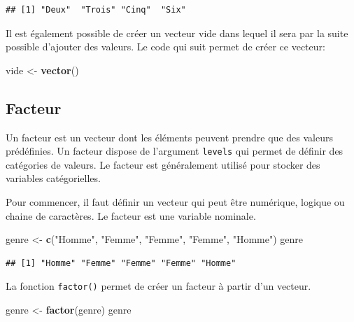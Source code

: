 \documentclass[
]{book}
\newenvironment{Shaded}{\begin{snugshade}}{\end{snugshade}}
\newcommand{\FunctionTok}[1]{\textcolor[rgb]{0.13,0.29,0.53}{\textbf{#1}}}
\newcommand{\NormalTok}[1]{#1}
\newcommand{\OtherTok}[1]{\textcolor[rgb]{0.56,0.35,0.01}{#1}}
\newcommand{\StringTok}[1]{\textcolor[rgb]{0.31,0.60,0.02}{#1}}
\begin{document}
\begin{verbatim}
## [1] "Deux"  "Trois" "Cinq"  "Six"
\end{verbatim}

Il est également possible de créer un vecteur vide dans lequel il sera par la suite possible d'ajouter des valeurs. Le code qui suit permet de créer ce vecteur:

\begin{Shaded}
\begin{Highlighting}[]
\NormalTok{vide }\OtherTok{\textless{}{-}} \FunctionTok{vector}\NormalTok{()}
\end{Highlighting}
\end{Shaded}

\subsection{Facteur}\label{facteur}

Un facteur est un vecteur dont les éléments peuvent prendre que des valeurs prédéfinies. Un facteur dispose de l'argument \texttt{levels} qui permet de définir des catégories de valeurs. Le facteur est généralement utilisé pour stocker des variables catégorielles.

Pour commencer, il faut définir un vecteur qui peut être numérique, logique ou chaine de caractères. Le facteur est une variable nominale.

\begin{Shaded}
\begin{Highlighting}[]
\NormalTok{genre }\OtherTok{\textless{}{-}} \FunctionTok{c}\NormalTok{(}\StringTok{"Homme"}\NormalTok{, }\StringTok{"Femme"}\NormalTok{, }\StringTok{"Femme"}\NormalTok{, }\StringTok{"Femme"}\NormalTok{, }\StringTok{"Homme"}\NormalTok{)}
\NormalTok{genre}
\end{Highlighting}
\end{Shaded}

\begin{verbatim}
## [1] "Homme" "Femme" "Femme" "Femme" "Homme"
\end{verbatim}

La fonction \texttt{factor()} permet de créer un facteur à partir d'un vecteur.

\begin{Shaded}
\begin{Highlighting}[]
\NormalTok{genre }\OtherTok{\textless{}{-}} \FunctionTok{factor}\NormalTok{(genre)}
\NormalTok{genre}
\end{Highlighting}
\end{Shaded}
\end{document}
